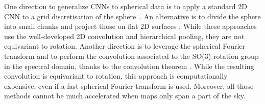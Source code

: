 \documentclass[final,twocolumn,3p,times,sort&compress]{elsarticle}
\newcommand{\1}{\b{1}}              %
\newcommand{\0}{\b{0}}              %
\begin{document}
One direction to generalize CNNs to spherical data is to apply a standard 2D CNN to a grid discretisation of the sphere~\citep{boomsma2017spherical,su2017sphericalconv,coors2018spherenet}.
An alternative is to divide the sphere into small chunks and project those on flat 2D surfaces \citep{fluri2018deep,gupta2018nongaussianinformation,schmelze2017cosmologicalmodel,gillet2018deeplearning}.
While these approaches use the well-developed 2D convolution and hierarchical pooling, they are not equivariant to rotation.
Another direction is to leverage the spherical Fourier transform and to perform the convolution associated to the SO(3) rotation group in the spectral domain, thanks to the convolution theorem \citep{cohen2018sphericalcnn, esteves2017sphericalcnn}.
While the resulting convolution is equivariant to rotation, this approach is computationally expensive, even if a fast spherical Fourier transform is used.
Moreover, all those methods cannot be much accelerated when maps only span a part of the sky.

\end{document}
